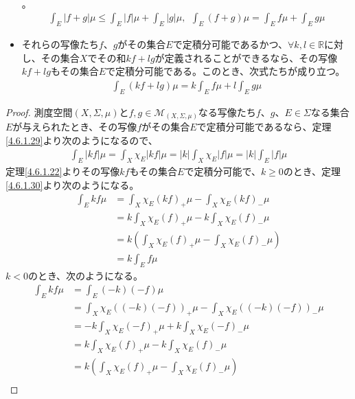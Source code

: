 \documentclass[dvipdfmx]{jsarticle}
\begin{document}
\begin{thm}
\begin{itemize}
{\begin{align*}
\end{align*}}。
\begin{align*}
\int_{E} {|f + g|\mu} \leq \int_{E} {|f|\mu} + \int_{E} {|g|\mu},\ \ \int_{E} {(f + g)\mu} = \int_{E} {f\mu} + \int_{E} {g\mu}
\end{align*}
\item
  それらの写像たち$f$、$g$がその集合$E$で定積分可能であるかつ、$\forall k,l \in \mathbb{R}$に対し、その集合$X$でその和$kf + lg$が定義されることができるなら、その写像$kf + lg$もその集合$E$で定積分可能である。このとき、次式たちが成り立つ。
\begin{align*}
\int_{E} {(kf + lg)\mu} = k\int_{E} {f\mu} + l\int_{E} {g\mu}
\end{align*}
\end{itemize}
\end{thm}
\begin{proof}
測度空間$(X,\varSigma,\mu)$と$f,g \in \mathcal{M}_{(X,\varSigma,\mu)}$なる写像たち$f$、$g$、$E \in \varSigma$なる集合$E$が与えられたとき、その写像$f$がその集合$E$で定積分可能であるなら、定理\ref{4.6.1.29}より次のようになるので、
\begin{align*}
\int_{E} {|kf|\mu} = \int_{X} {\chi_{E}|kf|\mu} = |k|\int_{X} {\chi_{E}|f|\mu} = |k|\int_{E} {|f|\mu}
\end{align*}
定理\ref{4.6.1.22}よりその写像$kf$もその集合$E$で定積分可能で、$k \geq 0$のとき、定理\ref{4.6.1.30}より次のようになる。
\begin{align*}
\int_{E} {kf\mu} &= \int_{X} {\chi_{E}(kf)_{+}\mu} - \int_{X} {\chi_{E}(kf)_{-}\mu}\\
&= k\int_{X} {\chi_{E}(f)_{+}\mu} - k\int_{X} {\chi_{E}(f)_{-}\mu}\\
&= k\left( \int_{X} {\chi_{E}(f)_{+}\mu} - \int_{X} {\chi_{E}(f)_{-}\mu} \right)\\
&= k\int_{E} {f\mu}
\end{align*}
$k < 0$のとき、次のようになる。
\begin{align*}
\int_{E} {kf\mu} &= \int_{E} {( - k)( - f)\mu}\\
&= \int_{X} {\chi_{E}\left( ( - k)( - f) \right)_{+}\mu} - \int_{X} {\chi_{E}\left( ( - k)( - f) \right)_{-}\mu}\\
&= - k\int_{X} {\chi_{E}( - f)_{+}\mu} + k\int_{X} {\chi_{E}( - f)_{-}\mu}\\
&= k\int_{X} {\chi_{E}(f)_{+}\mu} - k\int_{X} {\chi_{E}(f)_{-}\mu}\\
&= k\left( \int_{X} {\chi_{E}(f)_{+}\mu} - \int_{X} {\chi_{E}(f)_{-}\mu} \right)\\

\end{align*}
\end{proof}
\end{document}
